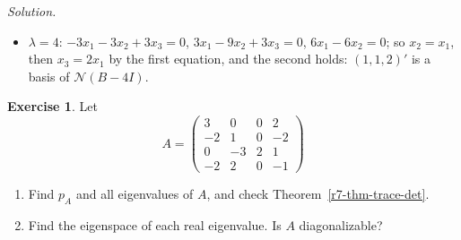 \documentclass[12pt]{article}
\DeclareMathOperator{\rank}{rank}
\DeclareMathOperator{\Span}{span}
\theoremstyle{definition}
\newtheorem{exercise}{Exercise}
\newenvironment{solution}{\par\noindent\textit{Solution.}\ }{\par\smallskip}
\begin{document}
\begin{solution}
\begin{itemize}
\(\Span\{(1,-1,1)\}\), \(\rank(B+2I)=1\) (Definition~\ref{def:r4-rank}) and \(\dim\mathcal N(B+2I)=2\)
(Theorem~\ref{thm:r4-rank-nullity}). The solutions \((1,0,-1)'\) and \((0,1,1)'\) are not multiples
of each other, so they are independent (Proposition~\ref{r3-prop-dependence}(c)) and form a basis of
\(\mathcal N(B+2I)\) (Theorem~\ref{thm:r4-counting}(d)).
\item \(\lambda=4\): \(-3x_1-3x_2+3x_3=0\), \(3x_1-9x_2+3x_3=0\), \(6x_1-6x_2=0\); so \(x_2=x_1\), then \(x_3=2x_1\) by the
first equation, and the second holds: \((1,1,2)'\) is a basis of \(\mathcal N(B-4I)\).
\end{itemize}
\end{solution}

\begin{exercise}\label{r7-ex-complex-drill}
Let
\[
A=\begin{pmatrix}3&0&0&2\\-2&1&0&-2\\0&-3&2&1\\-2&2&0&-1\end{pmatrix}
\]
\begin{enumerate}
\item Find \(p_A\) and all eigenvalues of \(A\), and check Theorem~\ref{r7-thm-trace-det}.
\item Find the eigenspace of each real eigenvalue. Is \(A\) diagonalizable?
\end{enumerate}
\end{exercise}
\end{document}
